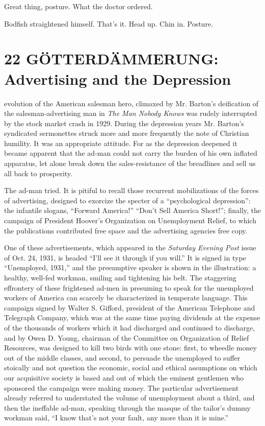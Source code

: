 \documentclass[twoside,nohyper,openany,nobib]{tufte-book}
\let\oldchapter\chapter
\def\chapter{%
  \setcounter{footnote}{0}%
  \oldchapter
}
\begin{document}
Great thing, posture. What the doctor ordered.

Bodfish straightened himself. That's it. Head up. Chin in. Posture.




\chapter[22 \hspace*{1mm} G{\"O}TTERD{\"A}MMERUNG]{22 G{\"O}TTERD{\"A}MMERUNG: Advertising and the \newline Depression}

 evolution of the American salesman hero, climaxed by Mr. Barton's
deification of the salesman-advertising man in \emph{The Man Nobody
Knows} was rudely interrupted by the stock market crash in 1929. During
the depression years Mr. Barton's syndicated sermonettes struck more and
more frequently the note of Christian humility. It was an appropriate
attitude. For as the depression deepened it became apparent that the
ad-man could not carry the burden of his own inflated apparatus, let
alone break down the sales-resistance of the breadlines and sell us all
back to prosperity.

The ad-man tried. It is pitiful to recall those recurrent mobilizations
of the forces of advertising, designed to exorcize the specter of a
``psychological depression'': the infantile slogans, ``Forward
America!'' ``Don't Sell America Short!''; finally, the campaign of
President Hoover's Organization on Unemployment Relief, to which the
publications contributed free space and the advertising agencies free
copy.

One of these advertisements, which appeared in the \emph{Saturday
Evening Post} issue of Oct. 24, 1931, is headed ``I'll see it through if
you will.'' It is signed in type ``Unemployed, 1931,'' and the
presumptive speaker is shown in the illustration: a healthy, well-fed
workman, smiling and tightening his belt. The staggering effrontery of
these frightened ad-men in presuming to speak for the unemployed workers
of America can scarcely be characterized in temperate language. This
campaign signed by Walter S. Gifford, president of the American
Telephone and Telegraph Company, which was at the same time paying
dividends at the expense of the thousands of workers which it had
discharged and continued to discharge, and by Owen D. Young, chairman of
the Committee on Organization of Relief Resources, was designed to kill
two birds with one stone: first, to wheedle money out of the middle
classes, and second, to persuade the unemployed to suffer stoically and
not question the economic, social and ethical assumptions on which our
acquisitive society is based and out of which the eminent gentlemen who
sponsored the campaign were making money. The particular advertisement
already referred to understated the volume of unemployment about a
third, and then the ineffable ad-man, speaking through the masque of the
tailor's dummy workman said, ``I know that's not your fault, any more
than it is mine.''
\end{document}
